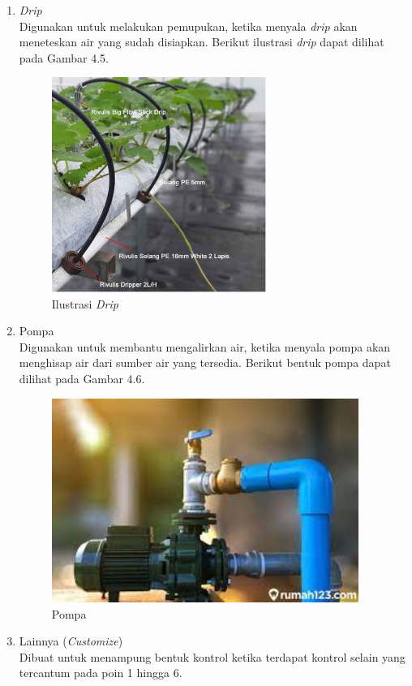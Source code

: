 \begin{flushleft}
\begin{justify}
\begin{enumerate}
            \item \emph{Drip} 
            \\Digunakan untuk melakukan pemupukan, ketika menyala \emph{drip} akan meneteskan air yang sudah disiapkan.
            Berikut ilustrasi \emph{drip} dapat dilihat pada Gambar 4.5.
            \vspace{4cm}
            \begin{figure}[ht]
                \centering
                \includegraphics[width=7cm]{images/bab 4/gambar_drip.png}
                \caption{Ilustrasi \textit{Drip}}
            \end{figure}
            \item Pompa 
            \\Digunakan untuk membantu mengalirkan air, 
            ketika menyala pompa akan menghisap air dari sumber air yang tersedia.
            Berikut bentuk pompa dapat dilihat pada Gambar 4.6.
            \begin{figure}[ht]
                \centering
                \includegraphics[width=10cm]{images/bab 4/gambar_pompa.jpeg}
                \caption{Pompa}
            \end{figure}
            \item Lainnya (\emph{Customize})\\
            Dibuat untuk menampung bentuk kontrol ketika terdapat kontrol selain yang tercantum pada poin 1 hingga 6.\\
        \end{enumerate}

\end{justify}
\end{flushleft}
